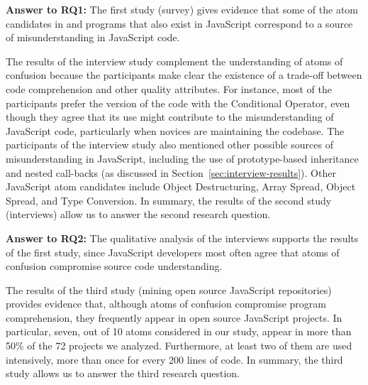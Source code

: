 \begin{mh}
  {\bf Answer to RQ1:} The first study (survey) gives evidence that some of the atom candidates in \clang and \cpplang programs that also exist in JavaScript correspond to a source of misunderstanding in
  JavaScript code. 
\end{mh}

The results of the interview study complement the understanding of atoms of confusion because the participants make clear the existence of a trade-off between code comprehension and other quality attributes. For instance, most of the participants prefer the version of the code with the Conditional Operator, even though they agree that its use might contribute to the misunderstanding of JavaScript code, particularly when novices are maintaining the codebase. The participants of the interview study also
mentioned other possible sources of misunderstanding in JavaScript,
including the use of prototype-based inheritance and nested call-backs (as discussed in Section~\ref{sec:interview-results}). Other JavaScript atom candidates include
Object Destructuring, Array Spread, Object Spread, and Type Conversion.
In summary, the results of the second study (interviews) allow
us to answer the second research question.

\begin{mh}
  {\bf Answer to RQ2:} The qualitative analysis of the
  interviews supports the results of the first study,
  since JavaScript developers most often agree that atoms of confusion compromise
  source code understanding. 
\end{mh}


The results of the third study (mining open source
JavaScript repositories) provides evidence that,
although atoms of confusion compromise program
comprehension, they frequently appear in open
source JavaScript projects. In particular,
seven, out of 10 atoms considered
  in our study, appear in more than 50\% of
the 72 projects we analyzed. Furthermore, at least two of them are used intensively, more than once for every 200 lines of code. In summary, the third study
allows us to answer the third research
question.


